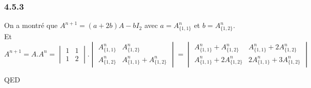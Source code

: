\documentclass[]{book}
\theoremstyle{definition}
\begin{document}
\subsubsection*{4.5.3}
On a montr\'e que $A^{n+1} = (a+2b)A - bI_2$ avec $a=A^n_{\{1,1\}}$ et $b=A^n_{\{1,2\}}$.\\

Et
$$
A^{n+1} = A.A^n = 
\begin{vmatrix} 1 & 1 \\ 1 & 2 \end{vmatrix} . 
\begin{vmatrix} A^n_{\{1,1\}} & A^n_{\{1,2\}} \\ A^n_{\{1,2\}} & A^n_{\{1,1\}} + A^n_{\{1,2\}} \end{vmatrix} = 
\begin{vmatrix} A^n_{\{1,1\}} + A^n_{\{1,2\}} & A^n_{\{1,1\}}+2A^n_{\{1,2\}} \\ A^n_{\{1,1\}} + 2A^n_{\{1,2\}} & 2A^n_{\{1,1\}} + 3A^n_{\{1,2\}} \end{vmatrix}
$$


 



QED
\end{document}
